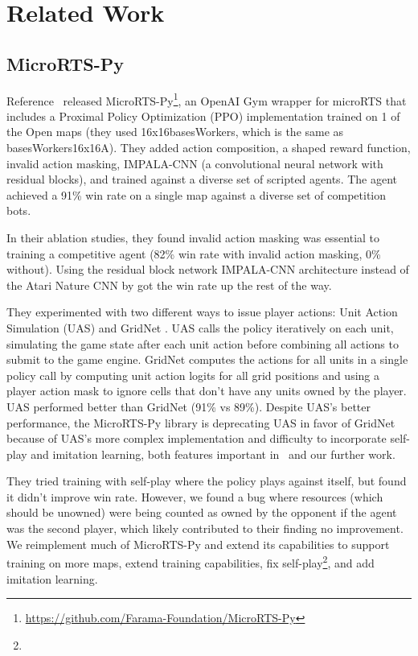 \documentclass[conference]{IEEEtran}
\newcommand{\mapname}[1]{#1} %
\begin{document}
\section{Related Work}
\subsection{MicroRTS-Py}
Reference~\cite{DBLP:journals/corr/abs-2105-13807} released
MicroRTS-Py\footnote{\url{https://github.com/Farama-Foundation/MicroRTS-Py}}, an OpenAI
Gym wrapper for microRTS that includes a Proximal Policy Optimization (PPO)
\cite{DBLP:journals/corr/SchulmanWDRK17} implementation trained on 1 of the Open maps
(they used \mapname{16x16basesWorkers}, which is the same as
\mapname{basesWorkers16x16A}). They added action composition, a shaped reward function,
invalid action masking, IMPALA-CNN \cite{DBLP:conf/icml/EspeholtSMSMWDF18} (a
convolutional neural network with residual blocks), and trained against a diverse set of
scripted agents. The agent achieved a 91\% win rate on a single map against a diverse
set of competition bots.

In their ablation studies, they found invalid action masking was essential to training a
competitive agent (82\% win rate with invalid action masking, 0\% without). Using the
residual block network IMPALA-CNN architecture instead of the Atari Nature CNN by
\cite{DBLP:journals/corr/MnihKSGAWR13} got the win rate up the rest of the way.

They experimented with two different ways to issue player actions: Unit Action
Simulation (UAS) and GridNet \cite{DBLP:conf/icml/HanSDXWSLZ19}. UAS calls the policy
iteratively on each unit, simulating the game state after each unit action before
combining all actions to submit to the game engine. GridNet computes the actions for all
units in a single policy call by computing unit action logits for all grid positions and
using a player action mask to ignore cells that don't have any units owned by the
player. UAS performed better than GridNet (91\% vs 89\%). Despite UAS's better
performance, the MicroRTS-Py library is deprecating UAS in favor of GridNet because of
UAS's more complex implementation and difficulty to incorporate self-play and imitation
learning, both features important in \agentName\ and our further work.

They tried training with self-play where the policy plays against itself, but found it
didn't improve win rate. However, we found a bug where resources
(which should be unowned) were being counted as owned by the opponent if the agent was
the second player, which likely contributed to their finding no improvement. We reimplement much of MicroRTS-Py and extend its capabilities to support training on
more maps, extend training capabilities, fix
self-play\footnote{\unownedFixGitHubCommit}, and add imitation learning.
\end{document}
